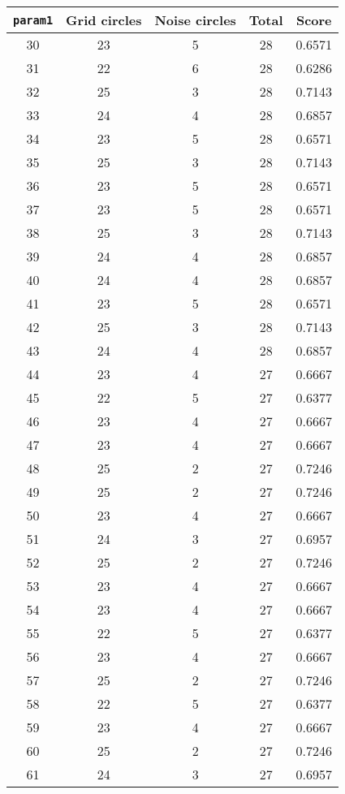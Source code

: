 \documentclass[letterpaper, 12pt]{article}
\begin{document}
\begin{longtable}{|c|c|c|c|c|}
\hline
\textbf{\texttt{param1}} & \textbf{Grid circles} & \textbf{Noise circles} & \textbf{Total} & \textbf{Score} \\
\hline
30 & 23 & 5 & 28 & 0.6571 \\
\hline
31 & 22 & 6 & 28 & 0.6286 \\
\hline
32 & 25 & 3 & 28 & 0.7143 \\
\hline
33 & 24 & 4 & 28 & 0.6857 \\
\hline
34 & 23 & 5 & 28 & 0.6571 \\
\hline
35 & 25 & 3 & 28 & 0.7143 \\
\hline
36 & 23 & 5 & 28 & 0.6571 \\
\hline
37 & 23 & 5 & 28 & 0.6571 \\
\hline
38 & 25 & 3 & 28 & 0.7143 \\
\hline
39 & 24 & 4 & 28 & 0.6857 \\
\hline
40 & 24 & 4 & 28 & 0.6857 \\
\hline
41 & 23 & 5 & 28 & 0.6571 \\
\hline
42 & 25 & 3 & 28 & 0.7143 \\
\hline
43 & 24 & 4 & 28 & 0.6857 \\
\hline
44 & 23 & 4 & 27 & 0.6667 \\
\hline
45 & 22 & 5 & 27 & 0.6377 \\
\hline
46 & 23 & 4 & 27 & 0.6667 \\
\hline
47 & 23 & 4 & 27 & 0.6667 \\
\hline
48 & 25 & 2 & 27 & 0.7246 \\
\hline
49 & 25 & 2 & 27 & 0.7246 \\
\hline
50 & 23 & 4 & 27 & 0.6667 \\
\hline
51 & 24 & 3 & 27 & 0.6957 \\
\hline
52 & 25 & 2 & 27 & 0.7246 \\
\hline
53 & 23 & 4 & 27 & 0.6667 \\
\hline
54 & 23 & 4 & 27 & 0.6667 \\
\hline
55 & 22 & 5 & 27 & 0.6377 \\
\hline
56 & 23 & 4 & 27 & 0.6667 \\
\hline
57 & 25 & 2 & 27 & 0.7246 \\
\hline
58 & 22 & 5 & 27 & 0.6377 \\
\hline
59 & 23 & 4 & 27 & 0.6667 \\
\hline
60 & 25 & 2 & 27 & 0.7246 \\
\hline
61 & 24 & 3 & 27 & 0.6957 \\

\end{longtable}
\end{document}
